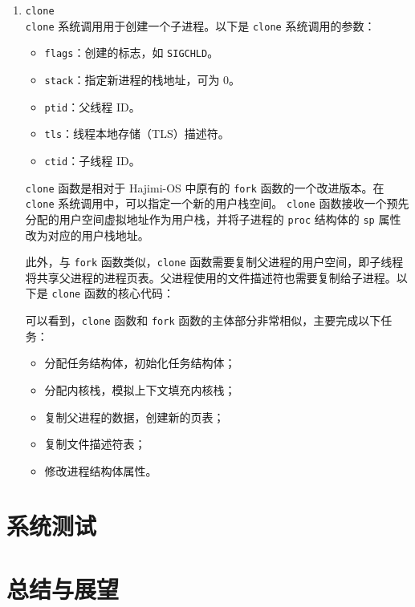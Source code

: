 \documentclass[UTF8]{article}
\begin{document}
\begin{enumerate}
  \item \texttt{clone\\}
        \texttt{clone} 系统调用用于创建一个子进程。以下是 \texttt{clone} 系统调用的参数：

        \begin{itemize}
          \item \texttt{flags}：创建的标志，如 \texttt{SIGCHLD}。
          \item \texttt{stack}：指定新进程的栈地址，可为 0。
          \item \texttt{ptid}：父线程 ID。
          \item \texttt{tls}：线程本地存储（TLS）描述符。
          \item \texttt{ctid}：子线程 ID。
        \end{itemize}

        \texttt{clone} 函数是相对于 Hajimi-OS 中原有的 \texttt{fork} 函数的一个改进版本。在 \texttt{clone} 系统调用中，可以指定一个新的用户栈空间。 \texttt{clone} 函数接收一个预先分配的用户空间虚拟地址作为用户栈，并将子进程的 \texttt{proc} 结构体的 \texttt{sp} 属性改为对应的用户栈地址。

        此外，与 \texttt{fork} 函数类似，\texttt{clone} 函数需要复制父进程的用户空间，即子线程将共享父进程的进程页表。父进程使用的文件描述符也需要复制给子进程。以下是 \texttt{clone} 函数的核心代码：
        
        可以看到，\texttt{clone} 函数和 \texttt{fork} 函数的主体部分非常相似，主要完成以下任务：

        \begin{itemize}
          \item 分配任务结构体，初始化任务结构体；
          \item 分配内核栈，模拟上下文填充内核栈；
          \item 复制父进程的数据，创建新的页表；
          \item 复制文件描述符表；
          \item 修改进程结构体属性。
        \end{itemize}

\end{enumerate}



\section{系统测试}

\section{总结与展望}
\end{document}
